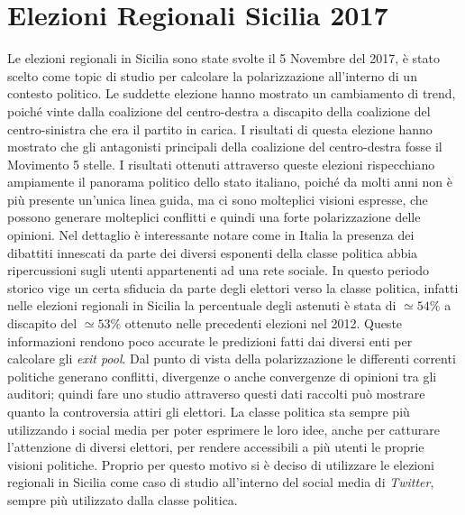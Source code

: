 \section{Elezioni Regionali Sicilia 2017}
Le elezioni regionali in Sicilia sono state svolte il 5 Novembre del 2017, è stato scelto come topic di studio per calcolare la polarizzazione all'interno di un contesto politico. Le suddette elezione hanno mostrato un cambiamento di trend, poiché vinte dalla coalizione del centro-destra a discapito della coalizione del centro-sinistra che era il partito in carica. I risultati di questa elezione hanno mostrato che gli antagonisti principali della coalizione del centro-destra fosse il Movimento 5 stelle.
I risultati ottenuti attraverso queste elezioni rispecchiano ampiamente il panorama politico dello stato italiano, poiché da molti anni non è più presente un'unica linea guida, ma ci sono molteplici visioni espresse, che possono generare molteplici conflitti e quindi una forte polarizzazione delle opinioni. Nel dettaglio è interessante notare come in Italia la presenza dei dibattiti innescati da parte dei diversi esponenti della classe politica abbia ripercussioni sugli utenti appartenenti ad una rete sociale.
In questo periodo storico vige un certa sfiducia da parte degli elettori verso la classe politica, infatti nelle elezioni regionali in Sicilia la percentuale degli astenuti è stata di $\simeq 54\%$ a discapito del $\simeq 53\%$ ottenuto nelle precedenti elezioni nel 2012. Queste informazioni rendono poco accurate le predizioni fatti dai diversi enti per calcolare gli \textit{exit pool}.
Dal punto di vista della polarizzazione le differenti correnti politiche generano conflitti, divergenze o anche convergenze di opinioni tra gli auditori; quindi fare uno studio attraverso questi dati raccolti può mostrare quanto la controversia attiri gli elettori.
La classe politica sta sempre più utilizzando i social media per poter esprimere le loro idee, anche per catturare l'attenzione di diversi elettori, per rendere accessibili a più utenti le proprie visioni politiche. 
Proprio per questo motivo si è deciso di utilizzare le elezioni regionali in Sicilia come caso di studio all'interno del social media di \textit{Twitter}, sempre più utilizzato dalla classe politica.


